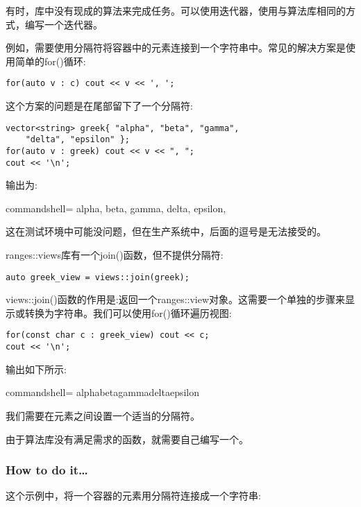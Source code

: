 
有时，库中没有现成的算法来完成任务。可以使用迭代器，使用与算法库相同的方式，编写一个迭代器。

例如，需要使用分隔符将容器中的元素连接到一个字符串中。常见的解决方案是使用简单的for()循环:

\begin{lstlisting}[style=styleCXX]
for(auto v : c) cout << v << ', ';
\end{lstlisting}

这个方案的问题是在尾部留下了一个分隔符:

\begin{lstlisting}[style=styleCXX]
vector<string> greek{ "alpha", "beta", "gamma",
	"delta", "epsilon" };
for(auto v : greek) cout << v << ", ";
cout << '\n';
\end{lstlisting}

输出为:

\begin{tcblisting}{commandshell={}}
alpha, beta, gamma, delta, epsilon,
\end{tcblisting}

这在测试环境中可能没问题，但在生产系统中，后面的逗号是无法接受的。

ranges::views库有一个join()函数，但不提供分隔符:

\begin{lstlisting}[style=styleCXX]
auto greek_view = views::join(greek);
\end{lstlisting}

views::join()函数的作用是:返回一个ranges::view对象。这需要一个单独的步骤来显示或转换为字符串。我们可以使用for()循环遍历视图:

\begin{lstlisting}[style=styleCXX]
for(const char c : greek_view) cout << c;
cout << '\n';
\end{lstlisting}

输出如下所示:

\begin{tcblisting}{commandshell={}}
alphabetagammadeltaepsilon
\end{tcblisting}

我们需要在元素之间设置一个适当的分隔符。

由于算法库没有满足需求的函数，就需要自己编写一个。

\subsubsection{How to do it…}

这个示例中，将一个容器的元素用分隔符连接成一个字符串:

